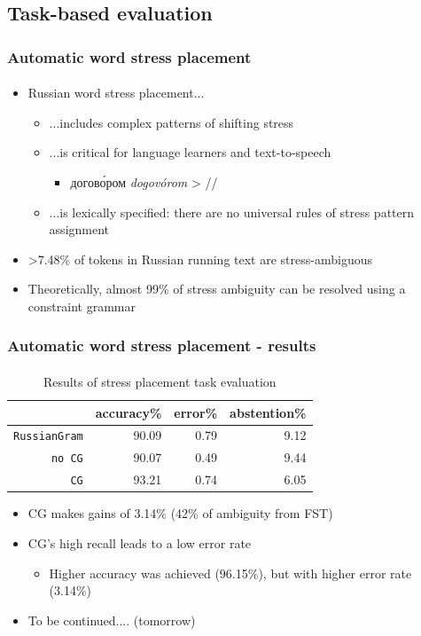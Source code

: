 \documentclass{beamer}
\newcommand{\rus}[1]{\foreignlanguage{russian}{#1}}
\begin{document}
\subsection{Task-based evaluation} %

\begin{frame}
\frametitle{Automatic word stress placement}
\framesubtitle{}
\begin{itemize}
	\item Russian word stress placement...
	\begin{itemize}
		\item ...includes complex patterns of shifting stress
		\pause
		\item ...is critical for language learners and text-to-speech\\
		\begin{itemize}
			\item \rus{догов\'{о}ром} \emph{dogovórom} > //
		\end{itemize}
		\pause
		\item ...is lexically specified: there are no universal rules of stress pattern assignment
		\pause
	\end{itemize}
	\item >7.48\% of tokens in Russian running text are stress-ambiguous
	\item Theoretically, almost 99\% of stress ambiguity can be resolved using a constraint grammar
\end{itemize}
\end{frame}

\begin{frame}
\frametitle{Automatic word stress placement - results}
\framesubtitle{}
\begin{table}
  \centering
  \begin{tabular}{r | r r r }
     & accuracy\% & error\% & abstention\%  \\
    \hline
    \hline
    {\small {\tt RussianGram}} & 90.09 & 0.79 & 9.12 \\
    {\small {\tt no CG}} & 90.07 & 0.49 & 9.44  \\
    {\small {\tt CG}} & 93.21 & 0.74 & 6.05
  \end{tabular}
  \caption{Results of stress placement task evaluation}
  \label{tab:results}
\end{table}
\begin{itemize}
	\item CG makes gains of 3.14\% (42\% of ambiguity from FST)
	\pause
	\item CG's high recall leads to a low error rate
	\begin{itemize}
		\item Higher accuracy was achieved (96.15\%), but with higher error rate (3.14\%)
	\end{itemize}
	\pause
	\item To be continued.... (tomorrow)
\end{itemize}
\end{frame}
\end{document}
